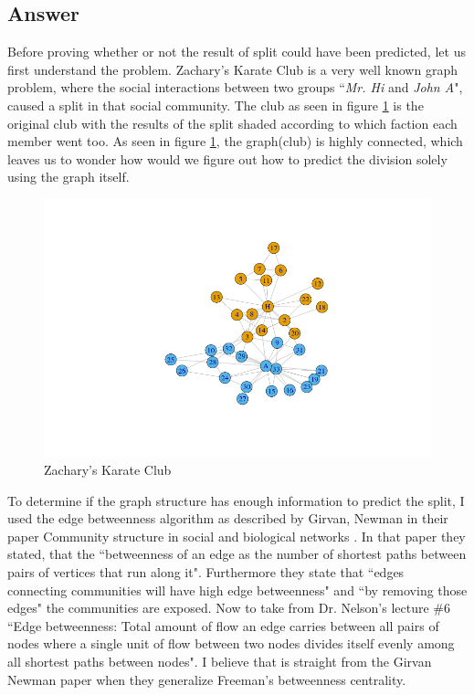 \documentclass[letterpaper,10pt]{article}
\begin{document}
\subsection*{Answer}
Before proving whether or not the result of split could have been predicted, let us first understand the problem. Zachary's Karate Club \cite{zacharykclub} is a very well known graph problem, where the social interactions between two groups ``\emph{Mr. Hi} and \emph{John A}", caused a split in that social community. The club as seen in figure \ref{fig:zkc} is the original club with the results of the split shaded according to which faction each member went too. As seen in figure \ref{fig:zkc}, the graph(club) is highly connected, which leaves us to wonder how would we figure out how to predict the division solely using the graph itself.

\begin{figure}[htbp]%
\begin{center}
\includegraphics[width=1.20\textwidth]{ZacharysKClub.png}
\end{center}
\caption{Zachary's Karate Club}
\label{fig:zkc}
\end{figure}

To determine if the graph structure has enough information to predict the split, I used the edge betweenness algorithm as described by Girvan, Newman in their paper Community structure in social and biological networks \cite{girnewman}. In that paper they stated, that the ``betweenness of an edge as the number of shortest paths between pairs of vertices that run along it". Furthermore they state that ``edges connecting communities will have high edge betweenness" and ``by removing those edges" the communities are exposed. Now to take from Dr. Nelson's lecture \#6 ``Edge betweenness: Total amount of flow an edge carries between all pairs of nodes where a single unit of flow between two nodes divides itself evenly among all shortest paths between nodes". I believe that is straight from the Girvan Newman paper when they generalize Freeman's betweenness centrality\cite{girnewman}.
\newline
\end{document}
